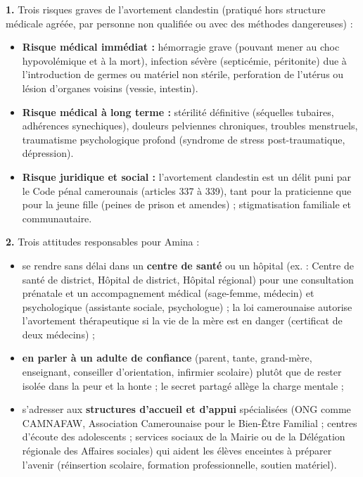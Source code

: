 \documentclass[11pt]{article}
\begin{document}
\begin{corrige}

\textbf{1.} Trois risques graves de l'avortement clandestin (pratiqué hors structure médicale agréée, par personne non qualifiée ou avec des méthodes dangereuses) :
\begin{itemize}
\item \textbf{Risque médical immédiat :} hémorragie grave (pouvant mener au choc hypovolémique et à la mort), infection sévère (septicémie, péritonite) due à l'introduction de germes ou matériel non stérile, perforation de l'utérus ou lésion d'organes voisins (vessie, intestin).
\item \textbf{Risque médical à long terme :} stérilité définitive (séquelles tubaires, adhérences synechiques), douleurs pelviennes chroniques, troubles menstruels, traumatisme psychologique profond (syndrome de stress post-traumatique, dépression).
\item \textbf{Risque juridique et social :} l'avortement clandestin est un délit puni par le Code pénal camerounais (articles 337 à 339), tant pour la praticienne que pour la jeune fille (peines de prison et amendes) ; stigmatisation familiale et communautaire.
\end{itemize}

\textbf{2.} Trois attitudes responsables pour Amina :
\begin{itemize}
\item se rendre sans délai dans un \textbf{centre de santé} ou un hôpital (ex. : Centre de santé de district, Hôpital de district, Hôpital régional) pour une consultation prénatale et un accompagnement médical (sage-femme, médecin) et psychologique (assistante sociale, psychologue) ; la loi camerounaise autorise l'avortement thérapeutique si la vie de la mère est en danger (certificat de deux médecins) ;
\item \textbf{en parler à un adulte de confiance} (parent, tante, grand-mère, enseignant, conseiller d'orientation, infirmier scolaire) plutôt que de rester isolée dans la peur et la honte ; le secret partagé allège la charge mentale ;
\item s'adresser aux \textbf{structures d'accueil et d'appui} spécialisées (ONG comme CAMNAFAW, Association Camerounaise pour le Bien-Être Familial ; centres d'écoute des adolescents ; services sociaux de la Mairie ou de la Délégation régionale des Affaires sociales) qui aident les élèves enceintes à préparer l'avenir (réinsertion scolaire, formation professionnelle, soutien matériel).
\end{itemize}


\end{corrige}
\end{document}
